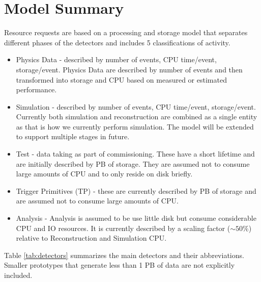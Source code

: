 \documentclass[12pt]{article}
\begin{document}
\section{Model Summary}

Resource requests are based on a processing and storage model that separates different phases of the detectors and includes 5 classifications of activity.

\begin{itemize}
\item Physics Data - described by number of events, CPU time/event, storage/event.  Physics Data are described by number of events and then transformed into storage and CPU based on measured or estimated performance. 
\item Simulation - described by number of events,  CPU time/event, storage/event.  Currently both simulation and reconstruction are combined as a single entity as that is how we currently perform simulation.  The model will be extended to support multiple stages in future. 
\item Test - data taking as part of commissioning.  These have a short lifetime and are initially described by PB of storage. They are assumed not to consume large amounts of CPU and to only reside on disk briefly. 
\item Trigger Primitives (TP) -  these are currently described by PB of storage and are assumed not to consume large amounts of CPU.  
\item Analysis - Analysis is assumed to be use little disk but consume considerable CPU and IO resources.  It is currently described by a scaling factor ($\sim 50\%$) relative to Reconstruction and Simulation CPU.
\end{itemize}

 Table \ref{tab:detectors} summarizes the main detectors and their abbreviations. Smaller prototypes that generate less than 1 PB of data  are not explicitly included. 
\end{document}
